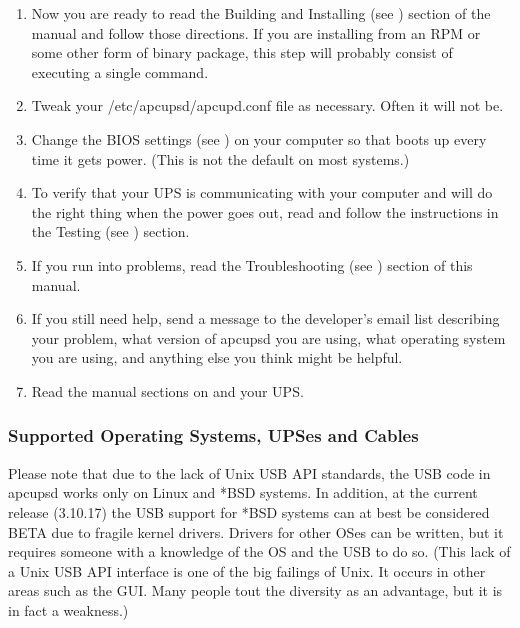 \begin{enumerate}
\item Now you are ready to read the Building and Installing (see 
) section of the manual
and follow those directions.  If you are installing from an RPM or some other
form of binary package, this step will probably consist of executing a single
command.  
\item Tweak your /etc/apcupsd/apcupd.conf file as necessary. Often it will not
be.  
\item Change the BIOS settings (see 
) on your computer
so that boots up every time it gets power. (This is not the default on most
systems.)  
\item To verify that your UPS is communicating with your computer and will do
the right thing when the power goes out, read and follow the instructions in
the Testing (see 
) section.  
\item If you run into problems, read the Troubleshooting (see 
) section of this
manual.  
\item If you still need help, send a message to the developer's email list 
 describing your problem, what version of apcupsd you
are using, what operating system you are using, and anything else you think
might be helpful.  
\item Read the manual sections on 
 and 
 your UPS.  
\end{enumerate}

\label{Supported-Operating-Systems_003b-UPSes-and-Cables}

\subsubsection*{Supported Operating Systems, UPSes and Cables}

\label{index-Supported-OSes-8}
\label{index-OSes-Supported-9}
Please note that due to the lack of Unix USB API standards, the USB code in
apcupsd works only on Linux and *BSD systems. In addition, at the current
release (3.10.17) the USB support for *BSD systems can at best be considered
BETA due to fragile kernel drivers. Drivers for other OSes can be written, but
it requires someone with a knowledge of the OS and the USB to do so.  (This
lack of a Unix USB API interface is one of the big failings of Unix.  It
occurs in other areas such as the GUI. Many people tout the diversity as an
advantage, but it is in fact a weakness.)  

